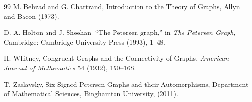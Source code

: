 \documentclass{article}
\begin{document}
\newpage
\begin{thebibliography}{99}
M. Behzad and G. Chartrand, Introduction to the Theory of Graphs, Allyn and Bacon (1973).

D. A. Holton and J. Sheehan, “The Petersen graph,” in \textit{The Petersen Graph}, Cambridge: Cambridge University Press (1993), 1--48.

H. Whitney, Congruent Graphs and the Connectivity of Graphs, \textit{American Journal of Mathematics} 54 (1932), 150--168.

T. Zaslavsky, Six Signed Petersen Graphs and their Automorphisms, Department of Mathematical Sciences, Binghamton University, (2011).
\end{thebibliography}
\end{document}
